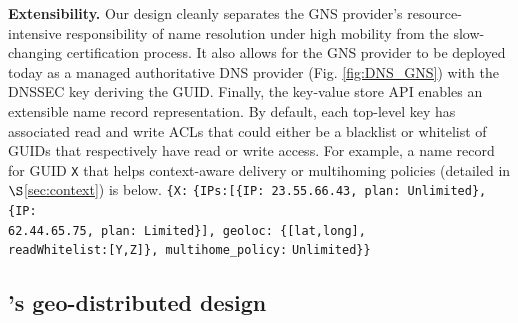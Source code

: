 
{\bf{Extensibility.}} Our design cleanly separates the GNS provider's resource-intensive responsibility of name resolution under high mobility from the slow-changing certification process. It also allows for the GNS provider to be deployed today as a managed authoritative DNS provider (Fig. \ref{fig:DNS_GNS}) with the DNSSEC key deriving the GUID. Finally, the key-value store API enables an extensible name record representation. By default, each top-level key has associated read and write ACLs that could either be a blacklist or whitelist of GUIDs that respectively have read or write access. For example, a name record for GUID \verb+X+ that helps context-aware delivery or multihoming policies (detailed in $\S$\ref{sec:context}) is below.
\verb+{X:+
\verb+{IPs:[{IP: 23.55.66.43, plan: Unlimited}, {IP:+\\
\verb+62.44.65.75, plan: Limited}], geoloc: {[lat,long],+\\
\verb+readWhitelist:[Y,Z]}, multihome_policy:+
\verb+Unlimited}}+



\subsection{\auspice's geo-distributed design}

